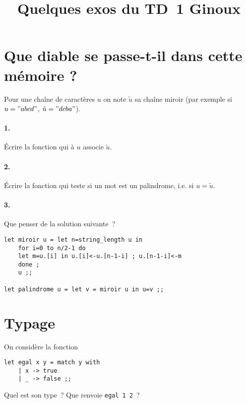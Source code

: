 \documentclass[10pt,a4paper]{article}
\begin{document}
\title{Quelques exos du TD 1 Ginoux}
\maketitle{}

\section{Que diable se passe-t-il dans cette mémoire ?}
Pour une chaîne de caractères $u$ on note $\tilde{u}$ sa chaîne miroir (par exemple si $u = "abcd"$, $\tilde{u} = "dcba"$).

\paragraph{1.} Écrire la fonction qui à $u$ associe $\tilde{u}$.

\paragraph{2.} Écrire la fonction qui teste si un mot est un palindrome, i.e. si $u = \tilde{u}$.

\paragraph{3.} Que penser de la solution suivante~?
\begin{verbatim}let miroir u = let n=string_length u in
    for i=0 to n/2-1 do
    let m=u.[i] in u.[i]<-u.[n-1-i] ; u.[n-1-i]<-m
    done ;
    u ;;
    
let palindrome u = let v = miroir u in u=v ;;    
\end{verbatim}

\section{Typage}
On considère la fonction
\begin{verbatim}let egal x y = match y with
    | x -> true
    | _ -> false ;;
\end{verbatim}
Quel est son type~? Que renvoie \texttt{egal 1 2}~?
\end{document}
